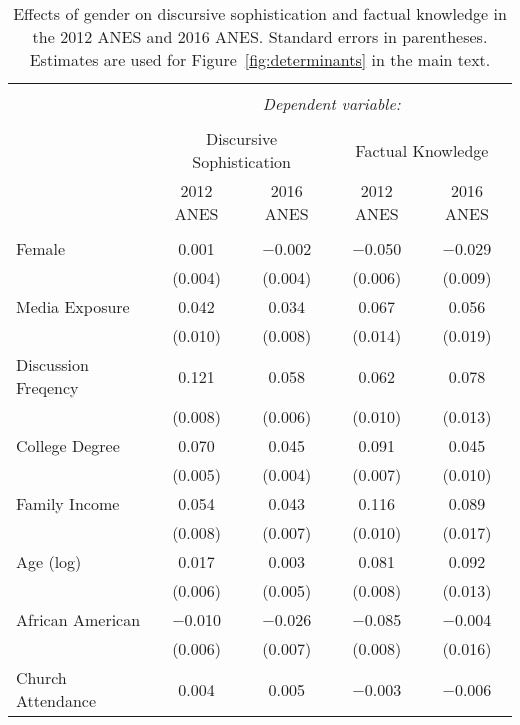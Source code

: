 
\begin{table}[!htbp] \centering 
  \caption[Effects of gender on discursive sophistication and factual knowledge in the 
  2012 ANES and 2016 ANES]{Effects of gender on discursive sophistication and factual knowledge in the 
          2012 ANES and 2016 ANES. Standard errors in parentheses. Estimates are used for 
          Figure~\ref{fig:determinants} in the main text.} 
  \label{tab:determinants_anes} 
\begin{tabular}{@{\extracolsep{0pt}}lcccc} 
\\[-1.8ex]\hline 
\hline \\[-1.8ex] 
 & \multicolumn{4}{c}{\textit{Dependent variable:}} \\ 
\cline{2-5} 
\\[-1.8ex] & \multicolumn{2}{c}{Discursive Sophistication} & \multicolumn{2}{c}{Factual Knowledge} \\ 
 & 2012 ANES & 2016 ANES & 2012 ANES & 2016 ANES \\ 
\hline \\[-1.8ex] 
 Female & 0.001 & $-$0.002 & $-$0.050 & $-$0.029 \\ 
  & (0.004) & (0.004) & (0.006) & (0.009) \\ 
  Media Exposure & 0.042 & 0.034 & 0.067 & 0.056 \\ 
  & (0.010) & (0.008) & (0.014) & (0.019) \\ 
  Discussion Freqency & 0.121 & 0.058 & 0.062 & 0.078 \\ 
  & (0.008) & (0.006) & (0.010) & (0.013) \\ 
  College Degree & 0.070 & 0.045 & 0.091 & 0.045 \\ 
  & (0.005) & (0.004) & (0.007) & (0.010) \\ 
  Family Income & 0.054 & 0.043 & 0.116 & 0.089 \\ 
  & (0.008) & (0.007) & (0.010) & (0.017) \\ 
  Age (log) & 0.017 & 0.003 & 0.081 & 0.092 \\ 
  & (0.006) & (0.005) & (0.008) & (0.013) \\ 
  African American & $-$0.010 & $-$0.026 & $-$0.085 & $-$0.004 \\ 
  & (0.006) & (0.007) & (0.008) & (0.016) \\ 
  Church Attendance & 0.004 & 0.005 & $-$0.003 & $-$0.006 \\ 

\end{tabular}
\end{table}
